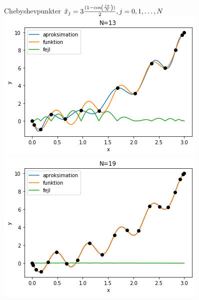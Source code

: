 
\begin{frame}{Chebyshevpunkter}
$\Tilde{x}_j = 3 \frac{(1 -\cos(\frac{j \pi}{N}))}{2}, j = 0, 1, \ldots , N$ \\
   \includegraphics[scale=0.35]{images/ChevN=13.png}
   \includegraphics[scale=0.35]{images/ChevN=19.png}
\end{frame}